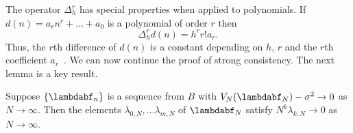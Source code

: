 \documentclass[journal]{IEEEtran}
\begin{document}
The operator $\Delta_h^r$ has special properties when applied to polynomials. If $d(n) = a_r n^r + \dots + a_0$ is a polynomial of order $r$ then
 \begin{equation} \label{eq:mfinitediffpoly}
 \Delta_h^r d(n) = h^r r! a_r. 
 \end{equation}
Thus, the $r$th difference of $d(n)$ is a constant depending on $h$, $r$ and the $r$th coefficient $a_r$~\cite[page 51]{Jordan_Calculus_of_finite_difference_1965}.  We can now continue the proof of strong consistency.  The next lemma is a key result.

\begin{lemma}\label{lem:moran2}
Suppose $\{\lambdabf_n\}$ is a sequence from $B$ with $V_N(\lambdabf_N) - \sigma^2\rightarrow 0$ as $N\rightarrow\infty$. Then the elements $\lambda_{0,N}, \dots \lambda_{m,N}$ of $\lambdabf_N$ satisfy $N^k\lambda_{k, N}\rightarrow0$ as $N\rightarrow\infty$.
\end{lemma}
\end{document}
